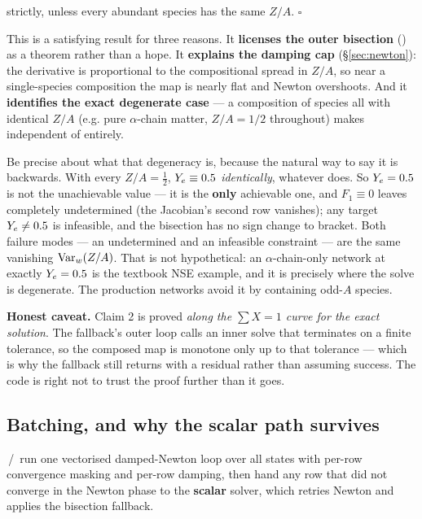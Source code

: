 strictly, unless every abundant species has the same $Z/A$. $\square$

This is a satisfying result for three reasons. It \textbf{licenses the outer
bisection} () as a theorem rather than a hope.
It \textbf{explains the damping cap} (\S\ref{sec:newton}): the derivative is
proportional to the compositional spread in $Z/A$, so near a single-species
composition the map is nearly flat and Newton overshoots. And it
\textbf{identifies the exact degenerate case} --- a composition of species all
with identical $Z/A$ (e.g. pure $\alpha$-chain matter, $Z/A = 1/2$ throughout)
makes \Ye{} independent of \up{} entirely.

Be precise about what that degeneracy is, because the natural way to say it is
backwards. With every $Z/A = \tfrac12$, $Y_{e} \equiv 0.5$ \emph{identically},
whatever \up{} does. So $Y_{e} = 0.5$ is not the unachievable value --- it is the
\textbf{only} achievable one, and $F_1 \equiv 0$ leaves \up{} completely
undetermined (the Jacobian's second row vanishes); any target $Y_{e} \ne 0.5$ is
infeasible, and the bisection has no sign change to bracket. Both failure modes
--- an undetermined \up{} and an infeasible constraint --- are the same
vanishing $\operatorname*{Var}_w(Z/A)$. That is not hypothetical: an $\alpha$-chain-only
network at exactly $Y_{e} = 0.5$ is the textbook NSE example, and it is precisely
where the solve is degenerate. The production networks avoid it by containing
odd-$A$ species.

\begin{warn}
\textbf{Honest caveat.} Claim 2 is proved \emph{along the $\sum X = 1$ curve for
the exact solution}. The fallback's outer loop calls an inner solve that
terminates on a finite tolerance, so the composed map is monotone only up to
that tolerance --- which is why the fallback still returns 
with a residual rather than assuming success. The code is right not to trust the
proof further than it goes.
\end{warn}

\subsection{Batching, and why the scalar path survives}
\label{sec:batching}

\,/\, run one vectorised
damped-Newton loop over all states with per-row convergence masking and per-row
damping, then hand any row that did not converge in the Newton phase to the
\textbf{scalar} solver, which retries Newton and applies the bisection fallback.


